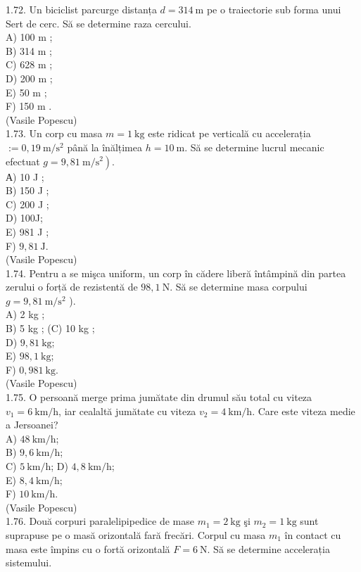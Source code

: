 \documentclass[10pt]{article}
\begin{document}
1.72. Un biciclist parcurge distanța $d=314 \mathrm{~m}$ pe o traiectorie sub forma unui Sert de cerc. Să se determine raza cercului.\\
A) 100 m ;\\
B) 314 m ;\\
C) 628 m ;\\
D) 200 m ;\\
E) 50 m ;\\
F) 150 m .\\
(Vasile Popescu)\\
1.73. Un corp cu masa $m=1 \mathrm{~kg}$ este ridicat pe verticală cu accelerația $:=0,19 \mathrm{~m} / \mathrm{s}^{2}$ până la înălțimea $h=10 \mathrm{~m}$. Să se determine lucrul mecanic efectuat $\left.g=9,81 \mathrm{~m} / \mathrm{s}^{2}\right)$.\\
А) 10 J ;\\
B) 150 J ;\\
C) 200 J ;\\
D) 100J;\\
E) 981 J ;\\
F) $9,81 \mathrm{~J}$.\\
(Vasile Popescu)\\
1.74. Pentru a se mişca uniform, un corp în cădere liberă întâmpină din partea zerului o forță de rezistentă de $98,1 \mathrm{~N}$. Să se determine masa corpului $g=9,81 \mathrm{~m} / \mathrm{s}^{2}$ ).\\
A) 2 kg ;\\
B) 5 kg ; (C) 10 kg ;\\
D) $9,81 \mathrm{~kg}$;\\
E) $98,1 \mathrm{~kg}$;\\
F) $0,981 \mathrm{~kg}$.\\
(Vasile Popescu)\\
1.75. O persoană merge prima jumătate din drumul său total cu viteza $v_{1}=6 \mathrm{~km} / \mathrm{h}$, iar cealaltă jumătate cu viteza $v_{2}=4 \mathrm{~km} / \mathrm{h}$. Care este viteza medie a Jersoanei?\\
A) $48 \mathrm{~km} / \mathrm{h}$;\\
B) $9,6 \mathrm{~km} / \mathrm{h}$;\\
C) $5 \mathrm{~km} / \mathrm{h}$; D) $4,8 \mathrm{~km} / \mathrm{h}$;\\
E) $8,4 \mathrm{~km} / \mathrm{h}$;\\
F) $10 \mathrm{~km} / \mathrm{h}$.\\
(Vasile Popescu)\\
1.76. Două corpuri paralelipipedice de mase $m_{1}=2 \mathrm{~kg}$ şi $m_{2}=1 \mathrm{~kg}$ sunt suprapuse pe o masă orizontală fară frecări. Corpul cu masa $m_{1}$ în contact cu masa este împins cu o fortă orizontală $F=6 \mathrm{~N}$. Să se determine accelerația sistemului.\\
\end{document}
